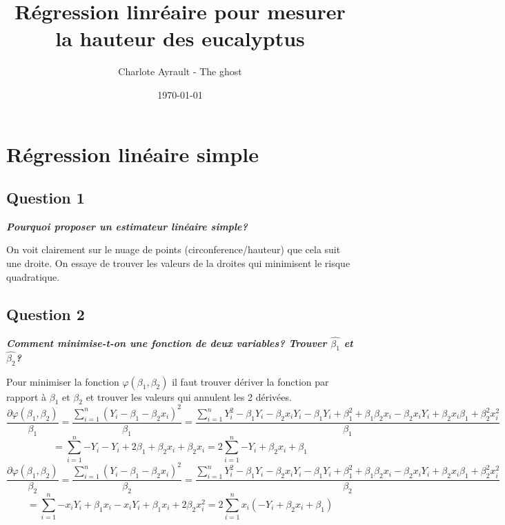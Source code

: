 \documentclass[pdflatex]{article}
\theoremstyle{definition}
\newcommand{\quest}[1]{\textbf{\textit{#1}} \vspace{3mm}}
\begin{document}
\title{R\'egression linr\'eaire pour mesurer la hauteur des eucalyptus}

\author{Charlote Ayrault - The ghost}
\date{\today}


\maketitle

\section*{R\'egression lin\'eaire simple}
\subsection*{Question 1}
\quest{Pourquoi proposer un estimateur lin\'eaire simple?}

On voit clairement sur le nuage de points (circonference/hauteur) que cela suit une droite. On essaye de trouver les valeurs de la droites qui minimisent le risque quadratique.

\subsection*{Question 2}
\quest{Comment minimise-t-on une fonction de deux variables? Trouver $\hat{\beta_1}$ et $\hat{\beta_2}$?}

Pour minimiser la fonction $\varphi(\beta_1, \beta_2)$ il faut trouver d\'eriver la fonction par rapport \`a $\beta_1$ et $\beta_2$ et trouver les valeurs qui annulent les 2 d\'eriv\'ees.
$$
\frac{\partial \varphi(\beta_1, \beta_2)}{\beta_1} = \frac{\sum_{i=1}^{n}{(Y_i - \beta_1 - \beta_2x_i)^2}}{\beta_1} = \frac{\sum_{i=1}^{n}{Y_i^2 - \beta_1Y_i - \beta_2x_iY_i -\beta_1Y_i + \beta_1^2 + \beta_1\beta_2x_i - \beta_2x_iY_i + \beta_2x_i\beta_1 +\beta_2^2x_i^2}}{\beta_1}
$$
$$
= \sum_{i=1}^{n}{-Y_i -Y_i +2\beta_1 +\beta_2x_i+\beta_2x_i} = 2 \sum_{i=1}^{n}{-Y_i+\beta_2x_i+\beta_1}
$$
$$
\frac{\partial \varphi(\beta_1, \beta_2)}{\beta_2} = \frac{\sum_{i=1}^{n}{(Y_i - \beta_1 - \beta_2x_i)^2}}{\beta_2} = \frac{\sum_{i=1}^{n}{Y_i^2 - \beta_1Y_i - \beta_2x_iY_i -\beta_1Y_i + \beta_1^2 + \beta_1\beta_2x_i - \beta_2x_iY_i + \beta_2x_i\beta_1 +\beta_2^2x_i^2}}{\beta_2}
$$
$$
= \sum_{i=1}^{n}{-x_iY_i+\beta_1x_i-x_iY_i + \beta_1x_i+2\beta_2x_i^2} = 2 \sum_{i=1}^{n}{x_i(-Y_i+\beta_2x_i+\beta_1)}
$$
\end{document}

